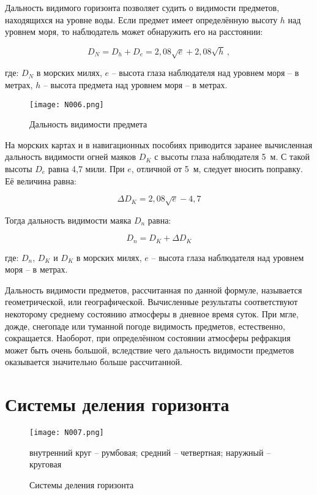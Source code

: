 Дальность видимого горизонта позволяет судить о видимости предметов,
находящихся на уровне воды. Если предмет имеет определённую высоту $h$
над уровнем моря, то наблюдатель может обнаружить его на расстоянии:

\begin{equation}
  D_N = D_h + D_e = 2,08 \sqrt{e} + 2,08 \sqrt{h} \, , 
\end{equation}

где: $D_N$ в морских милях, $e$ \--- высота глаза наблюдателя над
уровнем моря \--- в метрах, $h$ \--- высота предмета над уровнем моря
\--- в метрах.

\begin{figure*}[htb]
  \centering{}
  \texttt{[image: N006.png]}
  \caption{Дальность видимости предмета}
  \label{fig:N6}
\end{figure*}

На морских картах и в навигационных пособиях приводится заранее
вычисленная дальность видимости огней маяков $D_K$ с высоты глаза
наблюдателя 5~м. С такой высоты $D_e$ равна 4,7 мили. При $e$,
отличной от 5~м, следует вносить поправку. Её величина равна:

\begin{equation}
  \Delta D_K = 2,08 \sqrt{e} - 4,7 
\end{equation}

Тогда дальность видимости маяка $D_n$ равна: 

\begin{equation}
  D_n = D_K +  \Delta D_K 
\end{equation}

где: $D_n$, $D_K$ и $D_K$ в морских милях, $e$ \--- высота глаза
наблюдателя над уровнем моря \--- в метрах.
 
Дальность видимости предметов, рассчитанная по данной формуле,
называется геометрической, или географической. Вычисленные результаты
соответствуют некоторому среднему состоянию атмосферы в дневное время
суток. При мгле, дожде, снегопаде или туманной погоде видимость
предметов, естественно, сокращается. Наоборот, при определённом
состоянии атмосферы рефракция может быть очень большой, вследствие
чего дальность видимости предметов оказывается значительно больше
рассчитанной.

\section{Системы деления горизонта}

\begin{wrapfigure}[17]{O}{0.4\textwidth}
  \centering{}
  \texttt{[image: N007.png]}
  \caption{Системы деления горизонта}
  \label{fig:N7}
  \small
  \centering{}
  внутренний круг \--- румбовая; средний \--- четвертная; наружный \--- круговая
\end{wrapfigure}

